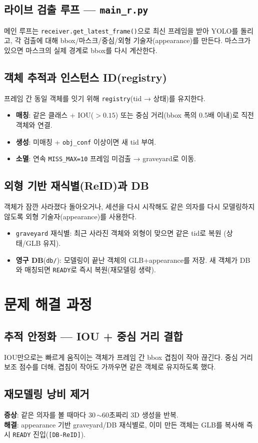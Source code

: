 \section{라이브 검출 루프 — \texttt{main\_r.py}}
메인 루프는 \texttt{receiver.get\_latest\_frame()}으로 최신 프레임을 받아
YOLO를 돌리고, 각 검출에 대해 bbox/마스크/중심/외형 기술자(appearance)를 만든다.
마스크가 있으면 마스크의 실제 경계로 bbox를 다시 계산한다.

\section{객체 추적과 인스턴스 ID(registry)}
프레임 간 동일 객체를 잇기 위해 \texttt{registry}(tid → 상태)를 유지한다.
\begin{itemize}
  \item \textbf{매칭}: 같은 클래스 + IOU($>0.15$) 또는 중심 거리(bbox 폭의 0.5배 이내)로
        직전 객체와 연결.
  \item \textbf{생성}: 미매칭 + \texttt{obj\_conf} 이상이면 새 tid 부여.
  \item \textbf{소멸}: 연속 \texttt{MISS\_MAX=10} 프레임 미검출 → graveyard로 이동.
\end{itemize}

\section{외형 기반 재식별(ReID)과 DB}
객체가 잠깐 사라졌다 돌아오거나, 세션을 다시 시작해도 같은 의자를 다시
모델링하지 않도록 외형 기술자(appearance)를 사용한다.
\begin{itemize}
  \item \texttt{graveyard} 재식별: 최근 사라진 객체와 외형이 맞으면 같은 tid로 복원
        (상태/GLB 유지).
  \item \textbf{영구 DB}(\texttt{db/}): 모델링이 끝난 객체의 GLB+appearance를 저장.
        새 객체가 DB와 매칭되면 \texttt{READY}로 즉시 복원(재모델링 생략).
\end{itemize}

\chapter{문제 해결 과정}

\section{추적 안정화 — IOU + 중심 거리 결합}
IOU만으로는 빠르게 움직이는 객체가 프레임 간 bbox 겹침이 작아 끊긴다. 중심
거리 보조 점수를 더해, 겹침이 작아도 가까우면 같은 객체로 유지하도록 했다.

\section{재모델링 낭비 제거}
\textbf{증상}: 같은 의자를 볼 때마다 30\,$\sim$60초짜리 3D 생성을 반복.\\
\textbf{해결}: appearance 기반 graveyard/DB 재식별로, 이미 만든 객체는 GLB를
복사해 즉시 \texttt{READY} 진입(\texttt{[DB-ReID]}).
